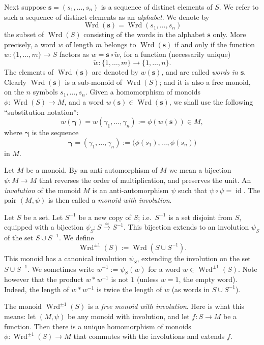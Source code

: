 \documentclass[10pt, a4paper]{amsart}
\theoremstyle{definition}
\numberwithin{equation}{section}
\newcommand{\iso}{\xrightarrow{\simeq}}
\newcommand{\opn}{\operatorname}
\newcommand{\bsym}[1]{\boldsymbol{#1}}
\newcommand{\til}[1]{\tilde{#1}}
\begin{document}
Next suppose $\bsym{s} = (s_1, \ldots, s_n)$ is a sequence of distinct elements
of $S$. We refer to such a sequence of distinct elements as an {\em alphabet}.
We denote by 
\[ \opn{Wrd}(\bsym{s}) = \opn{Wrd}(s_1, \ldots, s_n) \]
the subset of $\opn{Wrd}(S)$ consisting of the words in the alphabet $\bsym{s}$
only. More precisely, a word $w$ of length $m$ belongs to $\opn{Wrd}(\bsym{s})$
if and only if the function
$w : \{ 1, \ldots, m \} \to S$ factors as
$w = \bsym{s} \circ \til{w}$, for a function (necessarily unique)
\[ \til{w} : \{ 1, \ldots, m \} \to \{ 1, \ldots, n \} . \]
The elements of $\opn{Wrd}(\bsym{s})$ are denoted by $w(\bsym{s})$, and are
called {\em words in $\bsym{s}$}. Clearly $\opn{Wrd}(\bsym{s})$ is a sub-monoid
of $\opn{Wrd}(S)$; and
it is also a free monoid, on the $n$ symbols $s_1, \ldots, s_n$.
Given a homomorphism of monoids 
$\phi :  \opn{Wrd}(S) \to M$, and a word $w(\bsym{s}) \in \opn{Wrd}(\bsym{s})$, 
we shall use the following ``substitution notation'':
\[ w(\bsym{\gamma}) = w(\gamma_1, \ldots, \gamma_n) := \phi(w(\bsym{s})) \in M 
, \]
where $\bsym{\gamma}$ is the sequence
\[ \bsym{\gamma} = (\gamma_1, \ldots, \gamma_n) := 
\bigl( \phi(s_1), \ldots, \phi(s_n) \bigr) \]
in $M$. 

Let $M$ be a monoid. By an anti-automorphism of $M$ we mean a bijection 
$\psi : M \to  M$ that reverses the order of multiplication, and preserves the
unit. An {\em involution} of the monoid $M$ is an anti-automorphism $\psi$ such
that $\psi \circ \psi = \opn{id}$. 
The pair $(M, \psi)$ is then called a {\em monoid with involution}.

Let $S$ be a set. Let $S^{-1}$ be a new copy of $S$; i.e.\ $S^{-1}$
is a set disjoint from $S$, equipped with a bijection
$\psi_S : S \iso S^{-1}$. This bijection extends to an involution 
$\psi_S$ of the set $S \cup S^{-1}$. 
We define 
\[ \opn{Wrd}^{\pm 1}(S) := \opn{Wrd}(S \cup S^{-1}) . \]
This monoid has a canonical involution $\psi_S$, extending the involution on
the set $S \cup S^{-1}$. We sometimes write 
$w^{-1} := \psi_S(w)$ for a word $w \in \opn{Wrd}^{\pm 1}(S)$.
Note however that the product $w * w^{-1}$ is not $1$
(unless $w = 1$, the empty word). Indeed, the length of 
$w * w^{-1}$ is twice the length of $w$ (as words in $S \cup S^{-1}$).

The monoid $\opn{Wrd}^{\pm 1}(S)$ is a {\em free monoid with involution}. 
Here is what this means: let $(M, \psi)$ be any monoid with involution, and let
$f : S \to M$ be a function. Then there is a unique homomorphism of monoids
$\phi : \opn{Wrd}^{\pm 1}(S) \to M$ that commutes with the involutions and
extends
$f$. 
\end{document}
